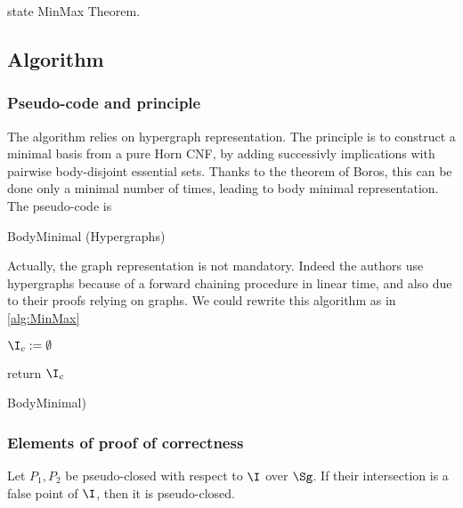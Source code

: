 state MinMax Theorem.

\subsection{Algorithm}
\subsubsection{Pseudo-code and principle}

The algorithm relies on hypergraph representation. The principle is to construct
a minimal basis from a pure Horn CNF, by adding successivly implications with 
pairwise body-disjoint essential sets. Thanks to the theorem of Boros, this can
be done only a minimal number of times, leading to body minimal representation.
The pseudo-code is 

\begin{algorithm}
	
\caption{BodyMinimal (Hypergraphs)}
\label{alg:MinMaxHyp}
\end{algorithm}

\noindent Actually, the graph representation is not mandatory. Indeed the 
authors use hypergraphs because of a forward chaining procedure in linear time,
and also due to their proofs relying on graphs. We could rewrite this algorithm
as in \ref{alg:MinMax}

\begin{algorithm}[H]

\BlankLine
\BlankLine

$\I_c := \emptyset$ \;

return $\I_c$ \;	

\caption{BodyMinimal)}
\label{alg:MinMax}
\end{algorithm}	

\subsubsection{Elements of proof of correctness}

\begin{proposition} \label{prop:let.pc_inter}
 Let $P_1, P_2$ be pseudo-closed with respect to $\I$ over 
$\Sg$. If their intersection is a false point of $\I$, then it is pseudo-closed.
	
\end{proposition}

